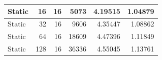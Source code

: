 \documentclass[journal,transmag]{IEEEtran}
\begin{document}
\begin{table}[h]
\begin{tabular}{|l|r|r|r|r|r|}
		Static        & 16                           & 16                           & 5073                              & 4.19515                       & 1.04879                         \\ \hline
		Static        & 32                           & 16                           & 9606                              & 4.35447                       & 1.08862                         \\ \hline
		Static        & 64                           & 16                           & 18609                             & 4.47396                       & 1.11849                         \\ \hline
		Static        & 128                          & 16                           & 36336                             & 4.55045                       & 1.13761                         \\ \hline
	\end{tabular}
\end{table}
	\newpage
	
\end{document}
